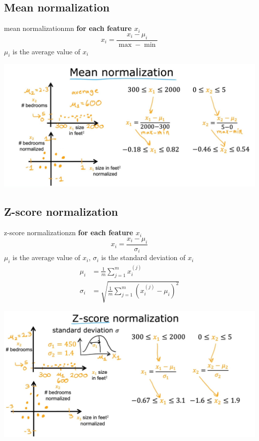 \subsection*{Mean normalization}
\begin{thmbox}{mean normalization}{mn}
\textbf{for each feature $x_i$}
\begin{equation}
    x_i = \frac{{x_i} - \mu_i}{\max - \min}
\end{equation}
$\mu_i$ is the average value of $x_i$
\end{thmbox}
\includegraphics*[width=\textwidth]{images/2.4 (5)}

\subsection*{Z-score normalization}
\begin{thmbox}{z-score normalization}{zn}
\textbf{for each feature $x_i$}
\begin{equation}
    x_i = \frac{{x_i} - \mu_i}{\sigma_i}
\end{equation}
$\mu_i$ is the average value of $x_i$, $\sigma_i$ is the standard deviation of $x_i$
\begin{align*}
    \mu_i &= \frac{1}{m} \sum_{j=1}^{m} x_i^{(j)} \\
    \sigma_i &= \sqrt{\frac{1}{m} \sum_{j=1}^{m} (x_i^{(j)} - \mu_i)^2}
\end{align*}
\end{thmbox}
\includegraphics*[width=\textwidth]{images/2.4 (6)}


